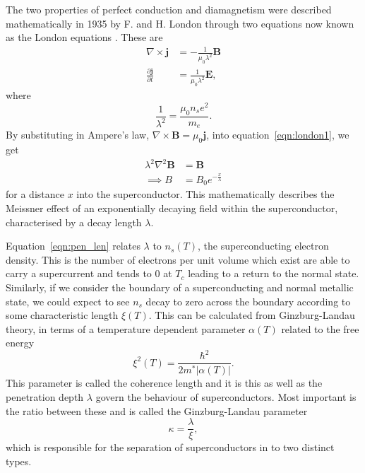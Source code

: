 \documentclass{article}
\numberwithin{equation}{section}
\begin{document}
The two properties of perfect conduction and diamagnetism were described mathematically in 1935 by F. and H. London through two equations now known as the London equations \cite{Poole2014Superconductivity}. These are
\begin{subequations}
\begin{align}
    \nabla \times \mathbf{j} &= -\frac{1}{\mu_0\lambda^2}\mathbf{B} \label{eqn:london1} \\
    \frac{\partial\mathbf{j}}{\partial t} &= \frac{1}{\mu_0\lambda^2}\mathbf{E} \label{eqn:london2},
\end{align}
\end{subequations}
where
\begin{equation}
    \frac{1}{\lambda^2} = \frac{\mu_0n_se^2}{m_e}. \label{eqn:pen_len}
\end{equation}
By substituting in Ampere's law, $\nabla \times \mathbf{B} = \mu_0 \mathbf{j}$, into equation~\ref{eqn:london1}, we get
\begin{align}
    \lambda^2\nabla^2\mathbf{B} &= \mathbf{B}\\
    \implies B &= B_0e^{-\frac{x}{\lambda}}
\end{align}
for a distance $x$ into the superconductor. This mathematically describes the Meissner effect of an exponentially decaying field within the superconductor, characterised by a decay length $\lambda$.

Equation~\ref{eqn:pen_len} relates $\lambda$ to $n_s(T)$, the superconducting electron density. This is the number of electrons per unit volume which exist are able to carry a supercurrent and tends to 0 at $T_c$ leading to a return to the normal state. Similarly, if we consider the boundary of a superconducting and normal metallic state, we could expect to see $n_s$ decay to zero across the boundary according to some characteristic length $\xi(T)$. This can be calculated from Ginzburg-Landau theory, in terms of a temperature dependent parameter $\alpha(T)$ related to the free energy \cite{Tinkham2004IntroductionSuperconductivity}
\begin{equation}
    \xi^2(T) = \frac{\hbar^2}{2m^*|\alpha(T)|}.
\end{equation}
This parameter is called the coherence length and it is this as well as the penetration depth $\lambda$ govern the behaviour of superconductors. Most important is the ratio between these and is called the Ginzburg-Landau parameter \cite{Tinkham2004IntroductionSuperconductivity}
\begin{equation}
    \kappa = \frac{\lambda}{\xi},
\end{equation}
which is responsible for the separation of superconductors in to two distinct types.
\end{document}
